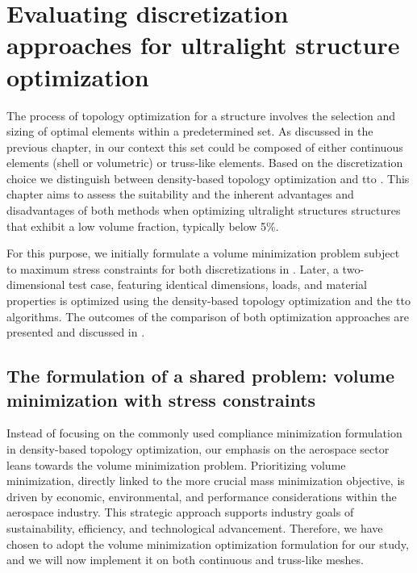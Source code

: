 \setchapterpreamble[u]{\margintoc}
\glsresetall %
\chapter{Evaluating discretization approaches for ultralight structure optimization} 
\label{chap:03}
The process of topology optimization for a structure involves the selection and sizing of optimal elements within a predetermined set. As discussed in the previous chapter, in our context this set could be composed of either continuous elements (shell or volumetric) or truss-like elements. Based on the discretization choice we distinguish between density-based topology optimization and \gls{tto} . This chapter aims to assess the suitability and the inherent advantages and disadvantages of both methods when optimizing ultralight structures \ie structures that exhibit a low volume fraction, typically below 5\%. 

For this purpose, we initially formulate a volume minimization problem subject to maximum stress constraints for both discretizations in . Later, a two-dimensional test case, featuring identical dimensions, loads, and material properties is optimized using the density-based topology optimization and the \gls{tto} algorithms. The outcomes of the comparison of both optimization approaches are presented and discussed in . 

\section{The formulation of a shared problem: volume minimization with stress constraints} \label{sec:03_common_prob}
Instead of focusing on the commonly used compliance minimization formulation in density-based topology optimization, our emphasis on the aerospace sector leans towards the volume minimization problem. Prioritizing volume minimization, directly linked to the more crucial mass minimization objective, is driven by economic, environmental, and performance considerations within the aerospace industry. This strategic approach supports industry goals of sustainability, efficiency, and technological advancement. Therefore, we have chosen to adopt the volume minimization optimization formulation for our study, and we will now implement it on both continuous and truss-like meshes.

